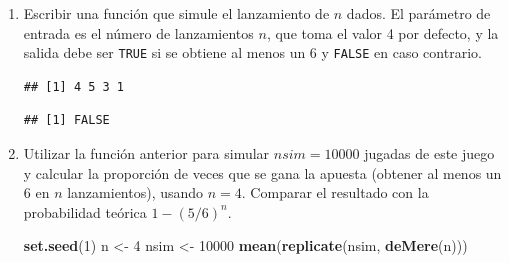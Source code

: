 \documentclass[]{book}
\newenvironment{Shaded}{\begin{snugshade}}{\end{snugshade}}
\newcommand{\KeywordTok}[1]{\textcolor[rgb]{0.13,0.29,0.53}{\textbf{#1}}}
\newcommand{\DataTypeTok}[1]{\textcolor[rgb]{0.13,0.29,0.53}{#1}}
\newcommand{\DecValTok}[1]{\textcolor[rgb]{0.00,0.00,0.81}{#1}}
\newcommand{\StringTok}[1]{\textcolor[rgb]{0.31,0.60,0.02}{#1}}
\newcommand{\OtherTok}[1]{\textcolor[rgb]{0.56,0.35,0.01}{#1}}
\newcommand{\ControlFlowTok}[1]{\textcolor[rgb]{0.13,0.29,0.53}{\textbf{#1}}}
\newcommand{\OperatorTok}[1]{\textcolor[rgb]{0.81,0.36,0.00}{\textbf{#1}}}
\newcommand{\NormalTok}[1]{#1}
\theoremstyle{definition}
\theoremstyle{definition}
\theoremstyle{definition}
\theoremstyle{remark}
\begin{document}
\begin{enumerate}
\def\labelenumi{\alph{enumi})}
\item
  Escribir una función que simule el lanzamiento de \(n\) dados. El
  parámetro de entrada es el número de lanzamientos \(n\), que toma el
  valor 4 por defecto, y la salida debe ser \texttt{TRUE} si se obtiene
  al menos un 6 y \texttt{FALSE} en caso contrario.

\begin{Shaded}
\end{Shaded}

\begin{verbatim}
## [1] 4 5 3 1
\end{verbatim}

\begin{Shaded}
\end{Shaded}

\begin{verbatim}
## [1] FALSE
\end{verbatim}
\item
  Utilizar la función anterior para simular \(nsim=10000\) jugadas de
  este juego y calcular la proporción de veces que se gana la apuesta
  (obtener al menos un 6 en \(n\) lanzamientos), usando \(n=4\).
  Comparar el resultado con la probabilidad teórica \(1-(5/6)^{n}\).

\begin{Shaded}
\begin{Highlighting}[]
\KeywordTok{set.seed}\NormalTok{(}\DecValTok{1}\NormalTok{)}
\NormalTok{n <-}\StringTok{ }\DecValTok{4}
\NormalTok{nsim <-}\StringTok{ }\DecValTok{10000}
\KeywordTok{mean}\NormalTok{(}\KeywordTok{replicate}\NormalTok{(nsim, }\KeywordTok{deMere}\NormalTok{(n)))}
\end{Highlighting}
\end{Shaded}


\end{enumerate}
\end{document}

